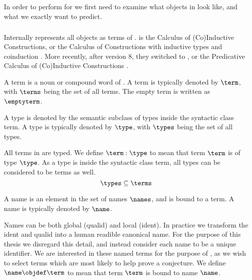 \subsection{\coq}

In order to perform \premiseselection for \coq we first need to examine what objects in \coq look like, and what we exactly want to predict.

\subsubsection{\pcic}

Internally \coq represents all objects as terms  of \cic {}.
\cic is the Calculus of (Co)Inductive Constructions,
or the Calculus of Constructions \cite{coquand1988calculus} with inductive types and coinduction \cite{huet1987induction} \cite{coquand1990inductively}.
More recently, after \coq version 8, they switched to \pcic {}, or the Predicative Calculus of (Co)Inductive Constructions \cite{bertot2013interactive}.

\begin{definition}[term]
	A term is a noun or compound word of \pcic.
	A term is typically denoted by $\term$, with $\terms$ being the set of all terms.
	The empty term is written as $\emptyterm$.
\end{definition}
\begin{definition}[type]
	A type is denoted by the semantic subclass of types inside the syntactic class term.
	A type is typically denoted by $\type$, with $\types$ being the set of all types.
\end{definition}

All terms in \coq are typed.
We define $\term : \type$ to mean that term $\term$ is of type $\type$.
As a type is inside the syntactic class term, all types can be considered to be terms as well.
\[ \types \subseteq \terms \]

\begin{definition}[name]
	A name is an element in the set of names $\names$, and is bound to a term. A name is typically denoted by $\name$.
\end{definition}
Names can be both global (qualid) and local (ident).
In practice we transform the ident and qualid into a human readible canonical name.
For the purpose of this thesis we disregard this detail, and instead consider each name to be a unique identifier.
We are interested in these named terms for the purpose of \premiseselection,
as we wish to select terms which are most likely to help prove a conjecture.
We define $\name \objdef \term$ to mean that term $\term$ is bound to name $\name$.

